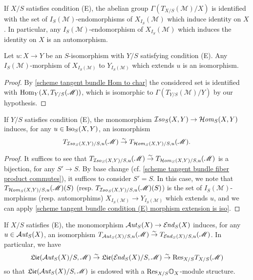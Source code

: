 \begin{proposition}\label{scheme tangent bundle condition (E) section over X abelian group char}
If $X/S$ satisfies condition (E), the abelian group $\Gamma(T_{X/S}(\mathscr{M})/X)$ is identified with the set of $I_S(\mathscr{M})$-endomorphisms of $X_{I_S}(\mathscr{M})$ which induce identity on $X$. In particular, any $I_S(\mathscr{M})$-endomorphism of $X_{I_S}(\mathscr{M})$ which induces the identity on $X$ is an automorphism.
\end{proposition}

\begin{corollary}\label{scheme tangent bundle condition (E) morphism extension is iso}
Let $u:X\to Y$ be an $S$-isomorphism with $Y/S$ satisfying condition (E). Any $I_S(\mathscr{M})$-morphism of $X_{I_S(\mathscr{M})}$ to $Y_{I_S(\mathscr{M})}$ which extends $u$ is an isomorphism.
\end{corollary}
\begin{proof}
By \cref{scheme tangent bundle Hom to char} the considered set is identified with $\mathrm{Hom}_Y(X,T_{Y/S}(\mathscr{M}))$, which is isomorphic to $\Gamma(T_{Y/S}(\mathscr{M})/Y)$ by our hypothesis.
\end{proof}

\begin{corollary}\label{scheme tangent bundle condition (E) fiber of Iso to Hom}
If $Y/S$ satisfies condition (E), the monomorphism $\operatorname{\mathcal{I}\hspace*{-0.5pt}\textit{so}\hspace{0.5pt}}_S(X,Y)\to\operatorname{\mathcal{H}\hspace*{-0.4pt}\textit{om}\hspace{0.5pt}}_S(X,Y)$ induces, for any $u\in\mathrm{Iso}_S(X,Y)$, an isomorphism
\[T_{\operatorname{\mathcal{I}\hspace*{-0.5pt}\textit{so}\hspace{0.5pt}}_S(X,Y)/S,u}(\mathscr{M})\stackrel{\sim}{\to} T_{\operatorname{\mathcal{H}\hspace*{-0.4pt}\textit{om}\hspace{0.5pt}}_S(X,Y)/S,u}(\mathscr{M}).\]
\end{corollary}
\begin{proof}
It suffices to see that $T_{\operatorname{\mathcal{I}\hspace*{-0.5pt}\textit{so}\hspace{0.5pt}}_S(X,Y)/S,u}(\mathscr{M})\stackrel{\sim}{\to} T_{\operatorname{\mathcal{H}\hspace*{-0.4pt}\textit{om}\hspace{0.5pt}}_S(X,Y)/S,u}(\mathscr{M})$ is a bijection, for any $S'\to S$. By base change (cf. \cref{scheme tangent bundle fiber product commutes}), it suffices to consider $S'=S$. In this case, we note that $T_{\operatorname{\mathcal{H}\hspace*{-0.4pt}\textit{om}\hspace{0.5pt}}_S(X,Y)/S,u}(\mathscr{M})(S)$ (resp. $T_{\operatorname{\mathcal{I}\hspace*{-0.5pt}\textit{so}\hspace{0.5pt}}_S(X,Y)/S,u}(\mathscr{M})(S)$) is the set of $I_S(\mathscr{M})$-morphisms (resp. automorphims) $X_{I_S(\mathscr{M})}\to Y_{I_S(\mathscr{M})}$ which extends $u$, and we can apply \cref{scheme tangent bundle condition (E) morphism extension is iso}.
\end{proof}

\begin{corollary}\label{scheme tangent bundle condition (E) fiber of Aut to End}
If $X/S$ satisfies (E), the monomorphism $\operatorname{\mathcal{A}\hspace*{-0.2pt}\textit{ut}\hspace{0.5pt}}_S(X)\to\operatorname{\mathcal{E}\hspace*{-1pt}\textit{nd}\hspace{0.5pt}}_S(X)$ induces, for any $u\in\operatorname{\mathcal{A}\hspace*{-0.2pt}\textit{ut}\hspace{0.5pt}}_S(X)$, an isomorphism $T_{\operatorname{\mathcal{A}\hspace*{-0.2pt}\textit{ut}\hspace{0.5pt}}_S(X)/S,u}(\mathscr{M})\stackrel{\sim}{\to} T_{\operatorname{\mathcal{E}\hspace*{-1pt}\textit{nd}\hspace{0.5pt}}_S(X)/S,u}(\mathscr{M})$. In particular, we have
\[\mathfrak{Lie}(\operatorname{\mathcal{A}\hspace*{-0.2pt}\textit{ut}\hspace{0.5pt}}_S(X)/S,\mathscr{M})\stackrel{\sim}{\to} \mathfrak{Lie}(\operatorname{\mathcal{E}\hspace*{-1pt}\textit{nd}\hspace{0.5pt}}_S(X)/S,\mathscr{M})\stackrel{\sim}{\to}\mathrm{Res}_{X/S}T_{X/S}(\mathscr{M})\]
so that $\mathfrak{Lie}(\operatorname{\mathcal{A}\hspace*{-0.2pt}\textit{ut}\hspace{0.5pt}}_S(X)/S,\mathscr{M})$ is endowed with a $\mathrm{Res}_{X/S}\mathbb{O}_X$-module structure.
\end{corollary}

